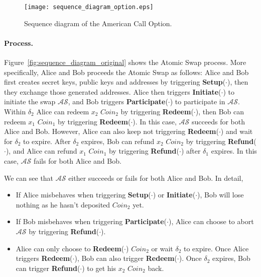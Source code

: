 \begin{figure}
    \texttt{[image: sequence\_diagram\_option.eps]}
    \caption{Sequence diagram of the American Call Option.}
    \label{fig:sequence_diagram_option}
\end{figure}


\paragraph{Process.}
Figure~\ref{fig:sequence_diagram_original} shows the Atomic Swap process.
More specifically, Alice and Bob proceeds the Atomic Swap as follows:
Alice and Bob first creates secret keys, public keys and addresses by triggering \textbf{Setup}($\cdot$), then they exchange those generated addresses.
Alice then triggers \textbf{Initiate}($\cdot$) to initiate the swap $\mathcal{AS}$, and Bob triggers \textbf{Participate}($\cdot$) to participate in $\mathcal{AS}$.
Within $\delta_2$ Alice can redeem $x_2$ $Coin_2$ by triggering \textbf{Redeem}($\cdot$), then Bob can redeem $x_1$ $Coin_1$ by triggering \textbf{Redeem}($\cdot$).
In this case, $\mathcal{AS}$ succeeds for both Alice and Bob.
However, Alice can also keep not triggering \textbf{Redeem}($\cdot$) and wait for $\delta_2$ to expire.
After $\delta_2$ expires, Bob can refund $x_2$ $Coin_2$ by triggering \textbf{Refund}($\cdot$), and Alice can refund $x_1$ $Coin_1$ by triggering \textbf{Refund}($\cdot$) after $\delta_1$ expires.
In this case, $\mathcal{AS}$ fails for both Alice and Bob.

We can see that $\mathcal{AS}$ either succeeds or fails for both Alice and Bob.
In detail,

\begin{itemize}
    \item If Alice misbehaves when triggering \textbf{Setup}($\cdot$) or \textbf{Initiate}($\cdot$), Bob will lose nothing as he hasn't deposited $Coin_2$ yet.
    \item If Bob misbehaves when triggering \textbf{Participate}($\cdot$), Alice can choose to abort $\mathcal{AS}$ by triggering \textbf{Refund}($\cdot$).
    \item Alice can only choose to \textbf{Redeem}($\cdot$) $Coin_2$ or wait $\delta_2$ to expire.
    Once Alice triggers \textbf{Redeem}($\cdot$), Bob can also trigger \textbf{Redeem}($\cdot$).
    Once $\delta_2$ expires, Bob can trigger \textbf{Refund}($\cdot$) to get his $x_2$ $Coin_2$ back.
\end{itemize}

